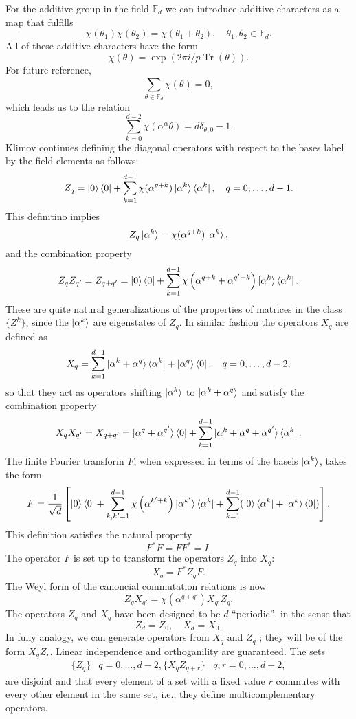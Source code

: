 \documentclass[a4paper]{article}
\DeclareMathOperator{\Tr}{Tr}
\begin{document}
  For the additive group in the field $\mathbb{F}_d$ we can
  introduce additive characters as a map that fulfills
  \[
    \chi(\theta_1)\chi(\theta_2) = \chi(\theta_1+\theta_2),
    \quad \theta_1,\theta_2 \in \mathbb{F}_d.
  \] 
  All of these additive characters have the form
  \[
    \chi(\theta)
    = \exp\left( 2\pi i / p \Tr(\theta) \right). 
  \] 
  For future reference,
  \[
    \sum_{\theta \in \mathbb{F}_d}^{} \chi(\theta) = 0,
  \] 
  which leads us to the relation
  \[
    \sum_{k=0}^{d-2} \chi(\alpha^\alpha \theta) =
    d\delta_{\theta,0} - 1.
  \] 
  Klimov continues defining the diagonal operators with
  respect to the bases label by the field elements as
  follows:
  \[
    Z_q
    = \ket 0 \bra 0 + \sum_{k=1}^{d-1} \chi(\alpha^{q+k})
    \ket{\alpha^k}\bra{\alpha^k},
    \quad q = 0,\ldots,d-1.
  \] 
  This definitino implies
  \[
    Z_q \ket{\alpha^k} = 
    \chi(\alpha^{q+k}) \ket{\alpha^k},
  \] 
  and the combination property
  \[
    Z_q Z_{q'}
    = Z_{q+q'}
    = \ket 0 \bra 0
    + \sum_{k=1}^{d-1} \chi\left( \alpha^{q+k} +
      \alpha^{q'+k} \right) \ket{\alpha^k} \bra{\alpha^k}.
  \] 
  These are quite natural generalizations of the properties
  of matrices in the class $\{Z^{k}\}$, since the
  $\ket{\alpha^k}$ are eigenstates of $Z_q$. In similar
  fashion the operators $X_q$ are defined as
  \[
    X_q
    = \sum_{k=1}^{d-1} \ket{\alpha^k + \alpha^q}
    \bra{\alpha^k} + \ket{\alpha^q} \bra 0,
    \quad q = 0,\ldots,d-2,
  \] 
  so that they act as operators shifting $\ket{\alpha^k}$ to
  $\ket{\alpha^k + \alpha^q}$ and satisfy the combination
  property
  \[
    X_qX_{q'}
    = X_{q+q'}
    = \ket{\alpha^q + \alpha^{q'}} \bra 0
    + \sum_{k=1}^{d-1} \ket{\alpha^k + \alpha^q +
      \alpha^{q'}} \bra{\alpha^k}.
  \] 
  The finite Fourier transform $F$, when expressed in terms
  of the baseis $\ket{\alpha^k}$, takes the form
  \[
    F
    = \frac{1}{\sqrt{d}} 
    \left[
      \ket 0 \bra 0 + \sum_{k,k'=1}^{d-1} \chi\left(
      \alpha^{k'+k} \right) \ket{\alpha^{k'}} \bra{\alpha^k}
      + \sum_{k=1}^{d-1} (\ket 0 \bra{\alpha^k} +
      \ket{\alpha^k}\bra 0)
    \right].
  \] 
  This definition satisfies the natural property
  \[
    F^{*}F = FF^{*} = I.
  \] 
  The operator $F$ is set up to transform the operators
  $Z_q$ into $X_q$:
  \[
    X_q = F^{*} Z_q F.
  \] 
  The Weyl form of the canoncial commutation relations is
  now
  \[
    Z_qX_{q'} = \chi\left( \alpha^{q+q'} \right) X_{q'}Z_q.
  \] 
  The operators $Z_q$ and $X_q$ have been designed to be
  $d$-``periodic'', in the sense that
  \[
    Z_d = Z_0,
    \quad
    X_d = X_0.
  \] 
  In fully analogy, we can generate operators from $X_q$ and
  $Z_q$ ; they will be of the form $X_qZ_r$. Linear
  independence and orthoganility are guaranteed. The sets
  \begin{align*}
    \{Z_q\} &q = 0,\ldots,d-2,
    \{X_qZ_{q+r}\} &q,r = 0,\ldots,d-2,
  \end{align*}
  are disjoint and that every element of a set with a fixed
  value $r$ commutes with every other element in the same
  set, i.e., they define multicomplementary operators.
\end{document}
